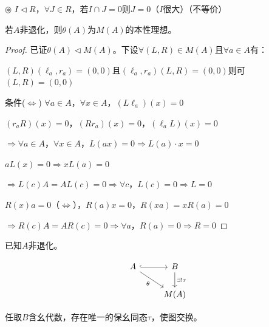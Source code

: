 \documentclass[lang=cn,a4paper,newtx,section]{elegantbook}
\begin{document}
\begin{remark}
  $\circledast$ $I \triangleleft R$，$\forall J \in R$，若$I \cap J = 0$则$J = 0$（$I$很大）（不等价）
\end{remark}

\begin{proposition}
  若$A$非退化，则$\theta(A)$为$M(A)$的本性理想。
\end{proposition}

\begin{proof}
  已证$\theta(A) \triangleleft M(A)$。下设$\forall (L, R) \in M(A)$且$\forall a \in A$有：
  
  $(L, R)(\ell_a, r_a) = (0, 0)$且$(\ell_a, r_a)(L, R) = (0, 0)$则可$(L, R) = (0, 0)$
  
  条件($\Leftrightarrow$) $\forall a \in A$，$\forall x \in A$，$(L \ell_a)(x) = 0$
  
  $(r_a R)(x) = 0$，$(R r_a)(x) = 0$，$(\ell_a L)(x) = 0$
  
  $\Rightarrow \forall a \in A$，$\forall x \in A$，$L(ax) = 0 \Rightarrow L(a) \cdot x = 0$
  
  $aL(x) = 0 \Rightarrow xL(a) = 0$
  
  $\Rightarrow L(c)A = AL(c) = 0 \Rightarrow \forall c$，$L(c) = 0 \Rightarrow L = 0$
  
  $R(x)a = 0$（$\Leftrightarrow$），$R(a)x = 0$，$R(xa) = xR(a) = 0$
  
  $\Rightarrow R(c)A = AR(c) = 0 \Rightarrow \forall a$，$R(a) = 0 \Rightarrow R = 0$
\end{proof}

\begin{theorem}
  已知$A$非退化。
  
  \begin{equation*}
    \begin{tikzcd}
      A \arrow[r, hook] \arrow[dr, "\theta"'] & B \arrow[d, "\exists! \tau"] \\
      & M(A)
    \end{tikzcd}
  \end{equation*}
  
  任取$B$含幺代数，存在唯一的保幺同态$\tau$，使图交换。
\end{theorem}
\end{document}
